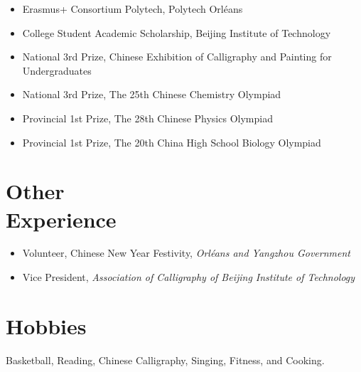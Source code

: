 \documentclass{mycv}
\begin{document}
\begin{itemize}
  \itemsep 0em
  \item Erasmus+ Consortium Polytech, Polytech Orléans 
  \item College Student Academic Scholarship, Beijing Institute of Technology 
  \item National 3rd Prize, Chinese Exhibition of Calligraphy and Painting for Undergraduates 
  \item National 3rd Prize, The 25th Chinese Chemistry Olympiad 
  \item Provincial 1st Prize, The 28th Chinese Physics Olympiad 
  \item Provincial 1st Prize, The 20th China High School Biology Olympiad 
\end{itemize}

\vspace{-0.5em}

\section{Other \\ Experience}
\begin{itemize}
  \itemsep 0em
  \item  Volunteer, Chinese New Year Festivity, \emph{Orl\'eans and Yangzhou Government} 
  \item Vice President, \emph{Association of Calligraphy of Beijing Institute of Technology} 
\end{itemize}

\vspace{-0.5em}

\section{Hobbies}
Basketball, Reading, Chinese Calligraphy, Singing, Fitness, and Cooking.

\end{document}
